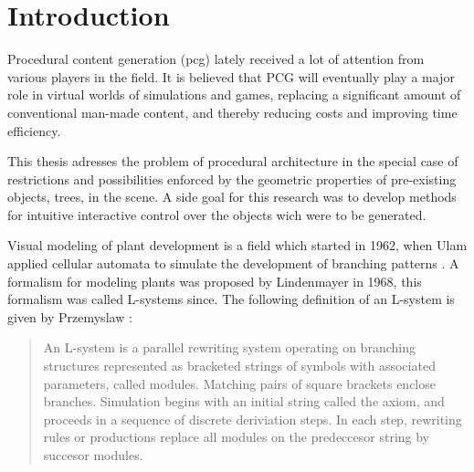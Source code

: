 
\chapter{Introduction}
\label{sec:intro}

Procedural content generation (pcg) lately received a lot of attention from various players in the field. It is believed that PCG will eventually play a major role in virtual worlds of simulations and games, replacing a significant amount of conventional man-made content, and thereby reducing costs and improving time efficiency.  

This thesis adresses the problem of procedural architecture in the special case of restrictions and possibilities enforced by the geometric properties of pre-existing objects, trees, in the scene. A side goal for this research was to develop methods for intuitive interactive control over the objects wich were to be generated. 



Visual modeling of plant development is a field which started in 1962, when Ulam applied cellular automata to 
simulate the development of branching patterns \citep{PrzemyslawPlants}. A formalism for modeling plants was proposed by Lindenmayer 
in 1968, this formalism was called L-systems since. The following definition of an L-system is given by Przemyslaw \citep{PrzemyslawPlants}: 

\begin{quote}
An L-system is a parallel rewriting system operating on branching structures represented as bracketed strings of symbols with associated parameters, called modules. Matching pairs of square brackets enclose branches. Simulation begins with an  initial string called the axiom, and proceeds in a sequence of discrete deriviation steps. In each step, rewriting rules or productions replace all modules on the predeccesor string by succesor modules.   
\end{quote}   


